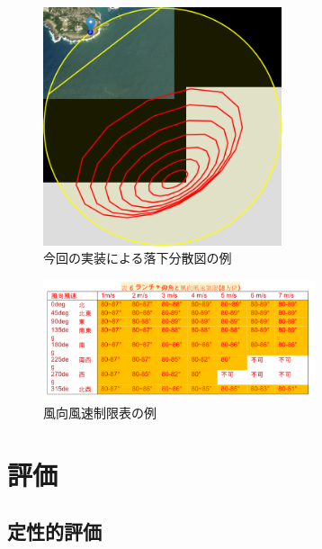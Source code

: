 \documentclass[a4j,10pt]{jsarticle}
\begin{document}
\begin{figure}[htbp]
	\begin{center}
		\includegraphics[width=7cm]{./ghp-new.png}
		\caption{今回の実装による落下分散図の例}
		\label{ghp-new}
	\end{center}
\end{figure}

\begin{figure}[htbp]
	\begin{center}
		\includegraphics[width=8cm]{./restrict-table-example.png}
		\caption{風向風速制限表の例}
		\label{restrict-table-example}
	\end{center}
\end{figure}



\section{評価}
\subsection{定性的評価}
\end{document}
